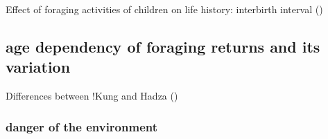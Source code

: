 Effect of foraging activities of children on life history: interbirth interval (\cite{blurton_jones_modelling_1989})

\subsection{age dependency of foraging returns and its variation}

Differences between !Kung and Hadza (\cite{blurton_jones_differences_1994})
\cite{blurton_jones_foraging_1994}

\cite{bird_children_1995}

\subsubsection{danger of the environment}

\cite{blurton_jones_differences_1994}




